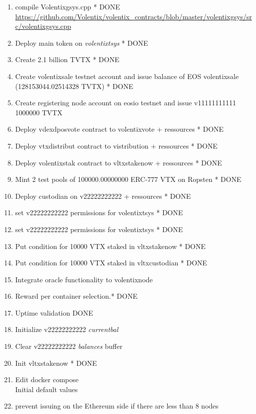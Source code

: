 \documentclass[]{article}
\begin{document}
  		\begin{enumerate}
  			\item compile Volentixgsys.cpp * {\color{green} DONE}\\ 
  			\url{https://github.com/Volentix/volentix_contracts/blob/master/volentixgsys/src/volentixgsys.cpp} 
  		  \item Deploy main token on \textit{volentixtsys} * {\color{green} DONE}
  		  \item Create 2.1 billion TVTX * {\color{green} DONE}
  		  \item Create volentixsale testnet account and issue balance of EOS volentixsale (128153044.02514328 TVTX) * {\color{green} DONE}
  		   \item Create registering node account on eosio testnet and issue  v11111111111 1000000 TVTX 
  		  \item Deploy vdexdposvote contract to volentixvote + ressources * {\color{green} DONE}
  		  \item Deploy vtxdistribut contract to vistribution + ressources * {\color{green} DONE}
  		  \item Deploy volentixstak  contract to vltxstakenow + ressources * {\color{green} DONE}
 		  \item Mint 2 test pools of 100000.00000000 ERC-777 VTX on Ropsten  * {\color{green} DONE}
		  \item Deploy custodian on v22222222222 + ressources  * {\color{green} DONE}
		  \item set v22222222222 permissions for volentixtsys * {\color{green} DONE}
		  \item set v22222222222 permissions for volentixtsys * {\color{green} DONE}
		  \item Put condition for 10000 VTX staked in vltxstakenow * {\color{green} DONE}
		  \item Put condition for 10000 VTX staked in vltxcustodian  * {\color{green} DONE}
		   \item Integrate oracle functionality to volentixnode
		   \item Reward per container selection.* {\color{yellow} DONE}
		   \item Uptime validation {\color{yellow} DONE}
		  \item Initialize v22222222222 \textit{currentbal}
		  \item Clear v22222222222 \textit{balances} buffer
		  \item Init vltxstakenow * {\color{green} DONE}
		  \item Edit docker compose\\
		  Initial default values	 
		  \item prevent issuing on the Ethereum side if there are less than 8 nodes
		   
	 \end{enumerate}
\end{document}
